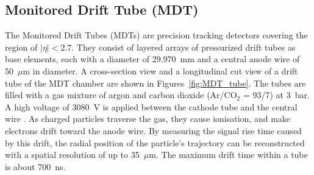 \subsection{Monitored Drift Tube (MDT)}
The Monitored Drift Tubes (MDTs) are precision tracking detectors covering the region of $|\eta| < 2.7$. They consist of layered arrays of pressurized drift tubes as base elements, each with a diameter of 29.970~mm and a central anode wire of 50~$\mu$m in diameter. A cross-section view and a longitudinal cut view of a drift tube of the MDT chamber are shown in Figures~\ref{fig:MDT_tube}. The tubes are filled with a gas mixture of argon and carbon dioxide (Ar/CO$_2$ = 93/7) at 3~bar. A high voltage of 3080~V is applied between the cathode tube and the central wire \cite{ATLASDetector2008}. As charged particles traverse the gas, they cause ionisation, and make electrons drift toward the anode wire. By measuring the signal rise time caused by this drift, the radial position of the particle's trajectory can be reconstructed with a spatial resolution of up to 35~$\mu$m. The maximum drift time within a tube is about 700~ns.

